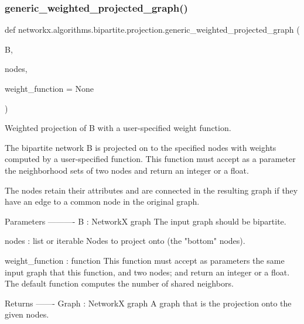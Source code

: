 \subsubsection{\texorpdfstring{generic\+\_\+weighted\+\_\+projected\+\_\+graph()}{generic\_weighted\_projected\_graph()}}
{\footnotesize\ttfamily def networkx.\+algorithms.\+bipartite.\+projection.\+generic\+\_\+weighted\+\_\+projected\+\_\+graph (\begin{DoxyParamCaption}\item[{}]{B,  }\item[{}]{nodes,  }\item[{}]{weight\+\_\+function = {\ttfamily None} }\end{DoxyParamCaption})}

\begin{DoxyVerb}Weighted projection of B with a user-specified weight function.

The bipartite network B is projected on to the specified nodes
with weights computed by a user-specified function.  This function
must accept as a parameter the neighborhood sets of two nodes and
return an integer or a float.

The nodes retain their attributes and are connected in the resulting graph
if they have an edge to a common node in the original graph.

Parameters
----------
B : NetworkX graph
    The input graph should be bipartite.

nodes : list or iterable
    Nodes to project onto (the "bottom" nodes).

weight_function : function
    This function must accept as parameters the same input graph
    that this function, and two nodes; and return an integer or a float.
    The default function computes the number of shared neighbors.

Returns
-------
Graph : NetworkX graph
   A graph that is the projection onto the given nodes.


\end{DoxyVerb}
